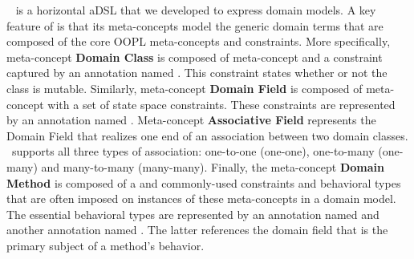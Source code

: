 ~\cite{le_domain_2018} is a horizontal aDSL that we developed to express domain models.
A key feature of  is that its meta-concepts model the generic domain terms that are composed of the core OOPL meta-concepts and constraints. More specifically, meta-concept \textbf{Domain Class} is composed of meta-concept  and a constraint captured by an annotation named . This constraint states whether or not the class is mutable. Similarly, meta-concept \textbf{Domain Field} is composed of meta-concept  with a set of state space constraints. 
These constraints are represented by an annotation named . 
Meta-concept \textbf{Associative Field} represents the Domain Field that realizes one end of an association between two domain classes. \dcsl~supports all three types of association: one-to-one (\abbr one-one), one-to-many (\abbr one-many) and many-to-many (\abbr many-many). 
Finally, the meta-concept \textbf{Domain Method} is composed of a  and commonly-used constraints and behavioral types that are often imposed on instances of these meta-concepts in a domain model. The essential behavioral types are represented by an annotation named  and another annotation named . The latter references the domain field that is the primary subject of a method's behavior.



